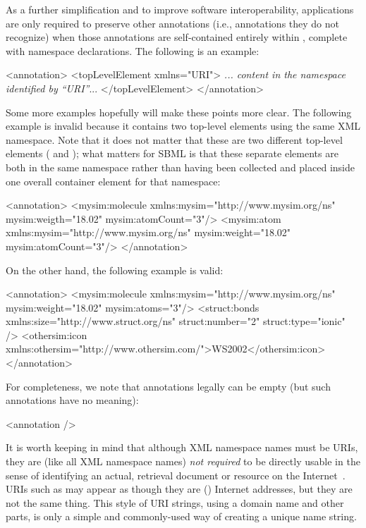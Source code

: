 As a further simplification and to improve software
interoperability, applications are only required to preserve other
annotations (i.e., annotations they do not recognize) when those
annotations are self-contained entirely within ,
complete with namespace declarations.  The following is an
example:

\begin{example}
<annotation>
    <topLevelElement xmlns="URI">
       \textrm{\emph{... content in the namespace identified by \textquotedblleft{}URI\textquotedblright}...}
    </topLevelElement>
</annotation>
\end{example}

Some more examples hopefully will make these points more clear.
The following example is invalid because it contains two top-level
elements using the same XML namespace.  Note that it does not
matter that these are two different top-level elements
( and ); what matters for
SBML is that these separate elements are both in the same
namespace rather than having been collected and placed inside one
overall container element for that namespace:

\begin{example}
<annotation>
    <mysim:molecule xmlns:mysim="http://www.mysim.org/ns"
        mysim:weigth="18.02" mysim:atomCount="3"/>
    <mysim:atom xmlns:mysim="http://www.mysim.org/ns"
        mysim:weight="18.02" mysim:atomCount="3"/>
</annotation>
\end{example}

On the other hand, the following example is valid:

\begin{example}
<annotation>
    <mysim:molecule xmlns:mysim="http://www.mysim.org/ns" mysim:weight="18.02" mysim:atoms="3"/>
    <struct:bonds xmlns:size="http://www.struct.org/ns" struct:number="2" struct:type="ionic" />
    <othersim:icon xmlns:othersim="http://www.othersim.com/">WS2002</othersim:icon>
</annotation>
\end{example}

For completeness, we note that annotations legally can be
empty (but such annotations have no meaning):

\begin{example}
<annotation />
\end{example}

It is worth keeping in mind that although XML namespace names must
be URIs, they are (like all XML namespace names) \emph{not
  required} to be directly usable in the sense of identifying an
actual, retrieval document or resource on the
Internet~\citep{bray:1999}.  URIs such as
 may appear as though they are (\eg)
Internet addresses, but they are not the same thing.  This style
of URI strings, using a domain name and other parts, is only a
simple and commonly-used way of creating a unique name string.

